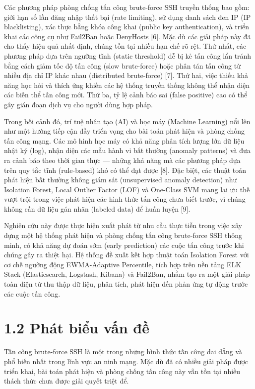 \documentclass[
  a4paper]{report}
\begin{document}
Các phương pháp phòng chống tấn công brute-force SSH truyền thống bao
gồm: giới hạn số lần đăng nhập thất bại (rate limiting), sử dụng danh
sách đen IP (IP blacklisting), xác thực bằng khóa công khai (public key
authentication), và triển khai các công cụ như Fail2Ban hoặc DenyHosts
{[}6{]}. Mặc dù các giải pháp này đã cho thấy hiệu quả nhất định, chúng
tồn tại nhiều hạn chế rõ rệt. Thứ nhất, các phương pháp dựa trên ngưỡng
tĩnh (static threshold) dễ bị kẻ tấn công lẩn tránh bằng cách giảm tốc
độ tấn công (slow brute-force) hoặc phân tán tấn công từ nhiều địa chỉ
IP khác nhau (distributed brute-force) {[}7{]}. Thứ hai, việc thiếu khả
năng học hỏi và thích ứng khiến các hệ thống truyền thống không thể nhận
diện các biến thể tấn công mới. Thứ ba, tỷ lệ cảnh báo sai (false
positive) cao có thể gây gián đoạn dịch vụ cho người dùng hợp pháp.

Trong bối cảnh đó, trí tuệ nhân tạo (AI) và học máy (Machine Learning)
nổi lên như một hướng tiếp cận đầy triển vọng cho bài toán phát hiện và
phòng chống tấn công mạng. Các mô hình học máy có khả năng phân tích
lượng lớn dữ liệu nhật ký (log), nhận diện các mẫu hành vi bất thường
(anomaly patterns) và đưa ra cảnh báo theo thời gian thực --- những khả
năng mà các phương pháp dựa trên quy tắc tĩnh (rule-based) khó có thể
đạt được {[}8{]}. Đặc biệt, các thuật toán phát hiện bất thường không
giám sát (unsupervised anomaly detection) như Isolation Forest, Local
Outlier Factor (LOF) và One-Class SVM mang lại ưu thế vượt trội trong
việc phát hiện các hình thức tấn công chưa biết trước, vì chúng không
cần dữ liệu gán nhãn (labeled data) để huấn luyện {[}9{]}.

Nghiên cứu này được thực hiện xuất phát từ nhu cầu thực tiễn trong việc
xây dựng một hệ thống phát hiện và phòng chống tấn công brute-force SSH
thông minh, có khả năng dự đoán sớm (early prediction) các cuộc tấn công
trước khi chúng gây ra thiệt hại. Hệ thống đề xuất kết hợp thuật toán
Isolation Forest với cơ chế ngưỡng động EWMA-Adaptive Percentile, tích
hợp trên nền tảng ELK Stack (Elasticsearch, Logstash, Kibana) và
Fail2Ban, nhằm tạo ra một giải pháp toàn diện từ thu thập dữ liệu, phân
tích, phát hiện đến phản ứng tự động trước các cuộc tấn công.

\section{1.2 Phát biểu vấn
đề}\label{phuxe1t-biux1ec3u-vux1ea5n-ux111ux1ec1}

Tấn công brute-force SSH là một trong những hình thức tấn công dai dẳng
và phổ biến nhất trong lĩnh vực an ninh mạng. Mặc dù đã có nhiều giải
pháp được triển khai, bài toán phát hiện và phòng chống tấn công này vẫn
tồn tại nhiều thách thức chưa được giải quyết triệt để.
\end{document}
